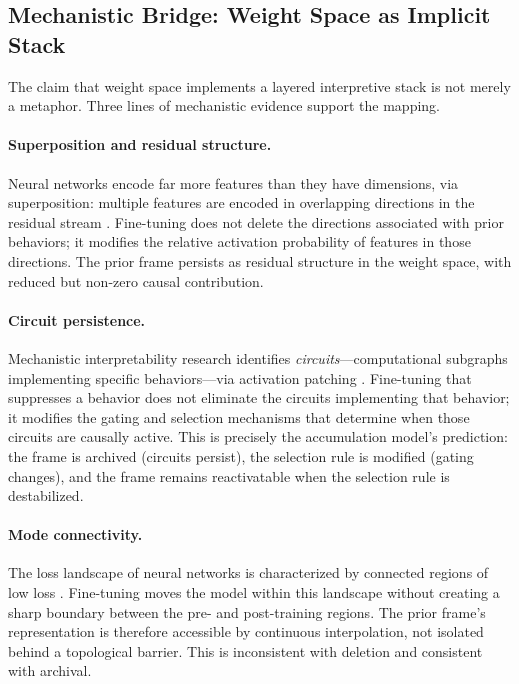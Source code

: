 \documentclass[12pt]{article}
\begin{document}
\subsection{Mechanistic Bridge: Weight Space as Implicit Stack}

The claim that weight space implements a layered interpretive stack
is not merely a metaphor.
Three lines of mechanistic evidence support the mapping.

\paragraph{Superposition and residual structure.}
Neural networks encode far more features than they have dimensions,
via superposition: multiple features are encoded in overlapping
directions in the residual stream \cite{elhage2022superposition}.
Fine-tuning does not delete the directions associated with prior
behaviors; it modifies the relative activation probability of
features in those directions.
The prior frame persists as residual structure in the weight space,
with reduced but non-zero causal contribution.

\paragraph{Circuit persistence.}
Mechanistic interpretability research identifies
\emph{circuits}---computational subgraphs implementing specific
behaviors---via activation patching \cite{conmy2023towards}.
Fine-tuning that suppresses a behavior does not eliminate the
circuits implementing that behavior; it modifies the gating and
selection mechanisms that determine when those circuits are causally
active.
This is precisely the accumulation model's prediction:
the frame is archived (circuits persist), the selection rule is
modified (gating changes), and the frame remains reactivatable
when the selection rule is destabilized.

\paragraph{Mode connectivity.}
The loss landscape of neural networks is characterized by
connected regions of low loss \cite{garipov2018loss}.
Fine-tuning moves the model within this landscape without creating
a sharp boundary between the pre- and post-training regions.
The prior frame's representation is therefore accessible by
continuous interpolation, not isolated behind a topological barrier.
This is inconsistent with deletion and consistent with archival.
\end{document}
